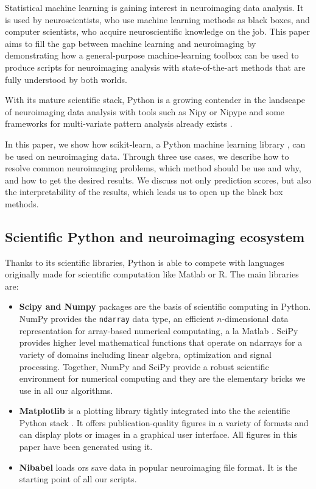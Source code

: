 \documentclass{frontiersSCNS} %
\begin{document}
Statistical machine learning is gaining interest in
neuroimaging data analysis. It is used by neuroscientists,
who use machine learning methods as black boxes, and computer scientists,
who acquire neuroscientific knowledge on the job. This paper aims to fill 
the gap between machine learning and neuroimaging by demonstrating how a 
general-purpose machine-learning toolbox can be used to produce scripts 
for neuroimaging analysis with state-of-the-art methods
that are fully understood by both worlds.

With its mature scientific stack, Python is a growing contender in the
landscape of neuroimaging data analysis with tools such as Nipy
\citep{millman2007analysis} or Nipype \citep{gorgolewski2011} and some
frameworks for multi-variate pattern analysis already exists
\citep{hanke2009pymvpa}. 

In this paper, we show how scikit-learn, a Python machine learning
library \citep{pedregosa2011}, can
be used on neuroimaging data. Through three use cases, we describe how to
resolve common neuroimaging problems, which method should be use and why, and how to
get the desired results. We discuss not only prediction scores, but
also the interpretability of the results, which leads us to open up the black
box methods.

\subsection{Scientific Python and neuroimaging ecosystem}

Thanks to its scientific libraries, Python is able to compete with languages
originally made for scientific computation like Matlab or R. The main libraries
are:
\begin{itemize}
    \item{\bf Scipy and Numpy} packages are the basis of scientific computing in Python.
        NumPy provides the \verb!ndarray! data type, an efficient $n$-dimensional data
        representation for array-based numerical computating, a la Matlab
        \citep{vanderwalt2011}.
        SciPy provides higher level mathematical functions that operate on ndarrays for
        a variety of domains including linear algebra, optimization and signal
        processing. Together, NumPy and SciPy provide a robust scientific environment
        for numerical computing and they are the elementary bricks we use in all our
        algorithms.

    \item{\bf Matplotlib} is a plotting library tightly integrated into the
        the scientific Python stack \citep{hunter2007}. It offers publication-quality figures in
        a variety of formats and can display plots or images in a
        graphical user interface. All figures in this paper have been generated using
        it.

    \item{\bf Nibabel} loads ors save data in popular neuroimaging file format.
        It is the starting point of all our scripts.
\end{itemize}
\end{document}
